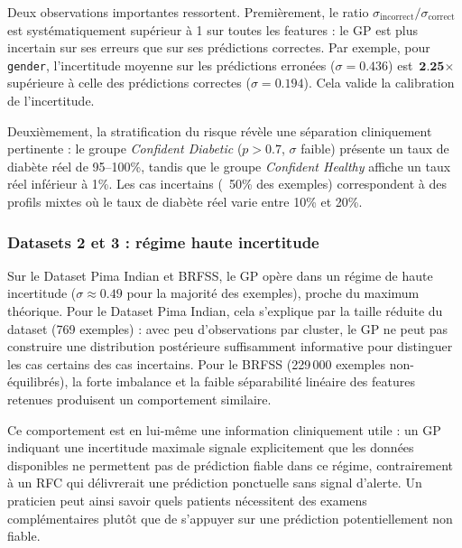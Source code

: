 \documentclass[12pt,a4paper]{article}
\begin{document}
Deux observations importantes ressortent. Premièrement, le ratio $\sigma_{\text{incorrect}} / \sigma_{\text{correct}}$ est systématiquement supérieur à 1 sur toutes les features : le GP est plus incertain sur ses erreurs que sur ses prédictions correctes. Par exemple, pour \texttt{gender}, l'incertitude moyenne sur les prédictions erronées ($\sigma = 0.436$) est $\textbf{2.25}\times$ supérieure à celle des prédictions correctes ($\sigma = 0.194$). Cela valide la calibration de l'incertitude.

Deuxièmement, la stratification du risque révèle une séparation cliniquement pertinente : le groupe \textit{Confident Diabetic} ($p > 0.7$, $\sigma$ faible) présente un taux de diabète réel de 95--100\%, tandis que le groupe \textit{Confident Healthy} affiche un taux réel inférieur à 1\%. Les cas incertains (~50\% des exemples) correspondent à des profils mixtes où le taux de diabète réel varie entre 10\% et 20\%.

\subsubsection*{Datasets 2 et 3 : régime haute incertitude}

Sur le Dataset Pima Indian et BRFSS, le GP opère dans un régime de haute incertitude ($\sigma \approx 0.49$ pour la majorité des exemples), proche du maximum théorique. Pour le Dataset Pima Indian, cela s'explique par la taille réduite du dataset (769 exemples) : avec peu d'observations par cluster, le GP ne peut pas construire une distribution postérieure suffisamment informative pour distinguer les cas certains des cas incertains. Pour le BRFSS (229\,000 exemples non-équilibrés), la forte imbalance et la faible séparabilité linéaire des features retenues produisent un comportement similaire.

Ce comportement est en lui-même une information cliniquement utile : un GP indiquant une incertitude maximale signale explicitement que les données disponibles ne permettent pas de prédiction fiable dans ce régime, contrairement à un RFC qui délivrerait une prédiction ponctuelle sans signal d'alerte. Un praticien peut ainsi savoir quels patients nécessitent des examens complémentaires plutôt que de s'appuyer sur une prédiction potentiellement non fiable.
\end{document}
